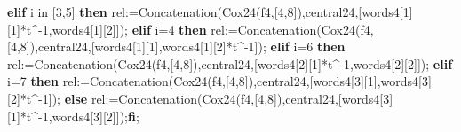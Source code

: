 \documentclass[
  10pt,
  letterpaper,
]{article}
\newenvironment{Shaded}{}{}
\newcommand{\BuiltInTok}[1]{\textcolor[rgb]{0.00,0.50,0.00}{#1}}
\newcommand{\ControlFlowTok}[1]{\textcolor[rgb]{0.00,0.44,0.13}{\textbf{#1}}}
\newcommand{\ExtensionTok}[1]{#1}
\newcommand{\FloatTok}[1]{\textcolor[rgb]{0.25,0.63,0.44}{#1}}
\newcommand{\NormalTok}[1]{#1}
\newcommand{\OperatorTok}[1]{\textcolor[rgb]{0.40,0.40,0.40}{#1}}
\newcommand{\VariableTok}[1]{\textcolor[rgb]{0.10,0.09,0.49}{#1}}
\begin{document}
\begin{Shaded}
\begin{Highlighting}[]
 \ControlFlowTok{elif} \VariableTok{i} \ExtensionTok{in}\NormalTok{ [}\FloatTok{3}\OperatorTok{,}\FloatTok{5}\NormalTok{] }\ControlFlowTok{then} \VariableTok{rel}\OperatorTok{:=}\BuiltInTok{Concatenation}\NormalTok{(}\VariableTok{Cox24}\NormalTok{(}\VariableTok{f4}\OperatorTok{,}\NormalTok{[}\FloatTok{4}\OperatorTok{,}\FloatTok{8}\NormalTok{])}\OperatorTok{,}\VariableTok{central24}\OperatorTok{,}\NormalTok{[}\VariableTok{words4}\NormalTok{[}\FloatTok{1}\NormalTok{][}\FloatTok{1}\NormalTok{]}\OperatorTok{*}\VariableTok{t}\OperatorTok{\^{}{-}}\FloatTok{1}\OperatorTok{,}\VariableTok{words4}\NormalTok{[}\FloatTok{1}\NormalTok{][}\FloatTok{2}\NormalTok{]])}\OperatorTok{;}
 \ControlFlowTok{elif} \VariableTok{i}\OperatorTok{=}\FloatTok{4} \ControlFlowTok{then} \VariableTok{rel}\OperatorTok{:=}\BuiltInTok{Concatenation}\NormalTok{(}\VariableTok{Cox24}\NormalTok{(}\VariableTok{f4}\OperatorTok{,}\NormalTok{[}\FloatTok{4}\OperatorTok{,}\FloatTok{8}\NormalTok{])}\OperatorTok{,}\VariableTok{central24}\OperatorTok{,}\NormalTok{[}\VariableTok{words4}\NormalTok{[}\FloatTok{1}\NormalTok{][}\FloatTok{1}\NormalTok{]}\OperatorTok{,}\VariableTok{words4}\NormalTok{[}\FloatTok{1}\NormalTok{][}\FloatTok{2}\NormalTok{]}\OperatorTok{*}\VariableTok{t}\OperatorTok{\^{}{-}}\FloatTok{1}\NormalTok{])}\OperatorTok{;}
 \ControlFlowTok{elif} \VariableTok{i}\OperatorTok{=}\FloatTok{6} \ControlFlowTok{then} \VariableTok{rel}\OperatorTok{:=}\BuiltInTok{Concatenation}\NormalTok{(}\VariableTok{Cox24}\NormalTok{(}\VariableTok{f4}\OperatorTok{,}\NormalTok{[}\FloatTok{4}\OperatorTok{,}\FloatTok{8}\NormalTok{])}\OperatorTok{,}\VariableTok{central24}\OperatorTok{,}\NormalTok{[}\VariableTok{words4}\NormalTok{[}\FloatTok{2}\NormalTok{][}\FloatTok{1}\NormalTok{]}\OperatorTok{*}\VariableTok{t}\OperatorTok{\^{}{-}}\FloatTok{1}\OperatorTok{,}\VariableTok{words4}\NormalTok{[}\FloatTok{2}\NormalTok{][}\FloatTok{2}\NormalTok{]])}\OperatorTok{;}
 \ControlFlowTok{elif} \VariableTok{i}\OperatorTok{=}\FloatTok{7} \ControlFlowTok{then} \VariableTok{rel}\OperatorTok{:=}\BuiltInTok{Concatenation}\NormalTok{(}\VariableTok{Cox24}\NormalTok{(}\VariableTok{f4}\OperatorTok{,}\NormalTok{[}\FloatTok{4}\OperatorTok{,}\FloatTok{8}\NormalTok{])}\OperatorTok{,}\VariableTok{central24}\OperatorTok{,}\NormalTok{[}\VariableTok{words4}\NormalTok{[}\FloatTok{3}\NormalTok{][}\FloatTok{1}\NormalTok{]}\OperatorTok{,}\VariableTok{words4}\NormalTok{[}\FloatTok{3}\NormalTok{][}\FloatTok{2}\NormalTok{]}\OperatorTok{*}\VariableTok{t}\OperatorTok{\^{}{-}}\FloatTok{1}\NormalTok{])}\OperatorTok{;}
 \ControlFlowTok{else} \VariableTok{rel}\OperatorTok{:=}\BuiltInTok{Concatenation}\NormalTok{(}\VariableTok{Cox24}\NormalTok{(}\VariableTok{f4}\OperatorTok{,}\NormalTok{[}\FloatTok{4}\OperatorTok{,}\FloatTok{8}\NormalTok{])}\OperatorTok{,}\VariableTok{central24}\OperatorTok{,}\NormalTok{[}\VariableTok{words4}\NormalTok{[}\FloatTok{3}\NormalTok{][}\FloatTok{1}\NormalTok{]}\OperatorTok{*}\VariableTok{t}\OperatorTok{\^{}{-}}\FloatTok{1}\OperatorTok{,}\VariableTok{words4}\NormalTok{[}\FloatTok{3}\NormalTok{][}\FloatTok{2}\NormalTok{]])}\OperatorTok{;}\ControlFlowTok{fi}\OperatorTok{;}

\end{Highlighting}
\end{Shaded}
\end{document}
